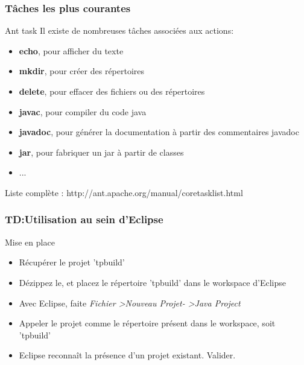 \documentclass[handout]{beamer}
\begin{document}
\subsubsection{Tâches les plus courantes}

\begin{frame}
\begin{block}{Ant task}
 	Il existe de nombreuses tâches associées aux actions:
	\begin{itemize}
		\item \textbf{echo}, pour afficher du texte
		\item \textbf{mkdir}, pour créer des répertoires
		\item \textbf{delete}, pour effacer des fichiers ou des répertoires
		\item \textbf{javac}, pour compiler du code java
		\item \textbf{javadoc}, pour générer la documentation à partir des commentaires javadoc
		\item \textbf{jar}, pour fabriquer un jar à partir de classes
		\item ...
	\end{itemize}
 	Liste complète : http://ant.apache.org/manual/coretasklist.html
\end{block}
\end{frame}
\subsubsection{TD:Utilisation au sein d'Eclipse}
\begin{frame}

	\begin{block}{Mise en place}
	 	\begin{itemize}
	 		\item Récupérer le projet 'tpbuild'
			\item Dézippez le, et placez le répertoire 'tpbuild' dans le workspace d'Eclipse
			\item Avec Eclipse, faite \textit{Fichier \textgreater Nouveau Projet- \textgreater Java Project}
			\item Appeler le projet comme le répertoire présent dans le workspace, soit 'tpbuild'
			\item Eclipse reconnaît la présence d'un projet existant. Valider.
	 	\end{itemize}
	\end{block}
\end{frame}
\end{document}
